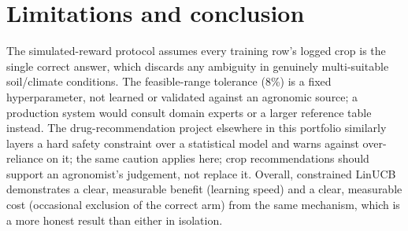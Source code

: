 \section{Limitations and conclusion}
The simulated-reward protocol assumes every training row's logged crop is
the single correct answer, which discards any ambiguity in genuinely
multi-suitable soil/climate conditions. The feasible-range tolerance (8\%)
is a fixed hyperparameter, not learned or validated against an agronomic
source; a production system would consult domain experts or a larger
reference table instead. The drug-recommendation project elsewhere in this
portfolio similarly layers a hard safety constraint over a statistical
model and warns against over-reliance on it; the same caution applies
here; crop recommendations should support an agronomist's judgement, not
replace it. Overall, constrained LinUCB demonstrates a clear, measurable
benefit (learning speed) and a clear, measurable cost (occasional exclusion
of the correct arm) from the same mechanism, which is a more honest result
than either in isolation.
